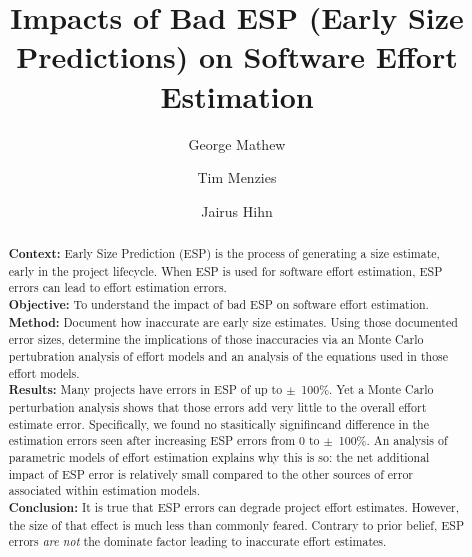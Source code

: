 \documentclass[final,twocolumn]{elsarticle}
\theoremstyle{break}
\begin{document}
\begin{frontmatter}
\title{ Impacts of Bad ESP (Early Size Predictions) on Software Effort Estimation}
\author{George Mathew}
\author{Tim Menzies}
\author{Jairus Hihn}
\address{Department of Computer Science, North Carolina State University, Raleigh, NC, USA,\\
Jet Propulsion Laboratory, Pasadena, CA}


\small

\begin{abstract}
  \textbf{Context:}
  Early Size Prediction (ESP) is the process of generating a size estimate, early in the project lifecycle. When ESP is used for software effort estimation,   ESP errors can lead to
  effort estimation errors.  \\
  \textbf{Objective:} To understand the impact of  bad ESP on software effort
  estimation. \\
  \textbf{Method:} Document how inaccurate are early
  size estimates. Using those documented error sizes, determine the implications of
  those inaccuracies via an Monte Carlo pertubration analysis of effort models
  and an analysis of the equations used in those effort
  models.\\
\textbf{Results:} 
Many 
projects have errors in ESP of up to $\pm$~100\%. Yet
a Monte Carlo perturbation analysis shows that those errors add very
little to the overall effort estimate error. Specifically,
we found no stasitically signifincand difference in
the estimation errors seen after
increasing ESP errors from 0 to $\pm$~100\%.
An analysis of parametric models of effort estimation explains why this is so:
the net additional impact  of ESP error is relatively  small compared to the other sources of error associated within
estimation models.\\
\textbf{Conclusion:} It is true that ESP errors can degrade
project effort estimates. However,
the size of that effect is much less than commonly feared.
Contrary to prior belief, ESP errors {\em are not} the dominate factor leading to inaccurate effort estimates.
\end{abstract}
\end{frontmatter}
\end{document}
